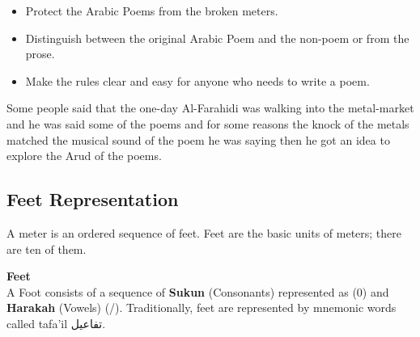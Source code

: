   \begin{itemize}
  \item Protect the Arabic Poems from the broken meters.
  \item Distinguish between the original Arabic Poem and the non-poem or from the prose.
    \item Make the rules clear and easy for anyone who needs to write a poem.
  \end{itemize}
  
    Some people said that the one-day Al-Farahidi was walking into the metal-market and he was said some of the poems and for some reasons the knock of the metals matched the musical sound of the poem he was saying then he got an idea to explore the Arud of the poems.
\newpage
    \subsection{Feet Representation}
    A meter is an ordered sequence of feet. Feet are the basic
units of meters; there are ten of them.
\begin{definition}\label{def:feet}
  \textbf{Feet} \hfill \\  A Foot consists of
a sequence of \textbf{Sukun} (Consonants) represented as (0) and \textbf{Harakah} (Vowels) (/). Traditionally, feet are represented by mnemonic words called tafa’il \textarabic{تفاعيل}.
\end{definition}


